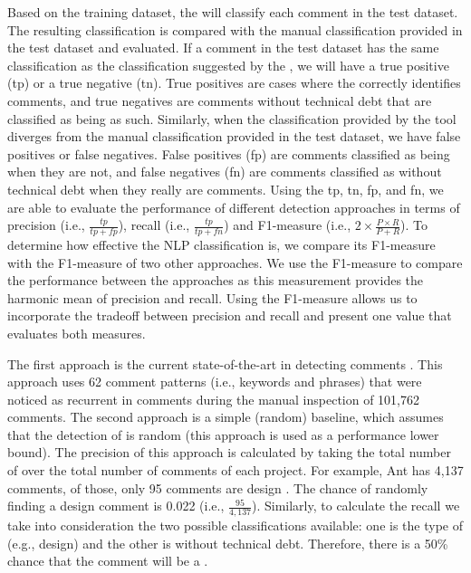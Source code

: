 Based on the training dataset, the  will classify each comment in the test dataset. The resulting classification is compared with the manual classification provided in the test dataset and evaluated. If a comment in the test dataset has the same classification as the classification suggested by the , we will have a true positive (tp) or a true negative (tn). True positives are cases where the  correctly identifies \SATD comments, and true negatives are comments without technical debt that are classified as being as such. Similarly, when the classification provided by the tool diverges from the manual classification provided in the test dataset, we have false positives or false negatives. False positives (fp) are comments classified as being \SATD when they are not, and false negatives (fn) are comments classified as without technical debt when they really are \SATD comments. Using the tp, tn, fp, and fn, we are able to evaluate the performance of different detection approaches in terms of precision (i.e., $\frac{tp}{tp + fp}$), recall (i.e., $\frac{tp}{tp + fn}$) and F1-measure (i.e., $2 \times \frac{P \times R}{P + R}$). To determine how effective the NLP classification is, we compare its F1-measure with the F1-measure of two other approaches. We use the F1-measure to compare the performance between the approaches as this measurement provides the harmonic mean of precision and recall. Using the F1-measure allows us to incorporate the tradeoff between precision and recall and present one value that evaluates both measures.

The first approach is the current state-of-the-art in detecting \SATD comments . This approach uses 62 comment patterns (i.e., keywords and phrases) that were noticed as recurrent in \SATD comments during the manual inspection of 101,762 comments. The second approach is a simple (random) baseline, which assumes that the detection of \SATD is random (this approach is used as a performance lower bound). The precision of this approach is calculated by taking the total number of \SATD over the total number of comments of each project. For example, Ant has 4,137 comments, of those, only 95 comments are design \SATD. The chance of randomly finding a design \SATD comment is 0.022 (i.e., $\frac{95}{4,137}$). Similarly, to calculate the recall we take into consideration the two possible classifications available: one is the type of \SATD (e.g., design) and the other is without technical debt. Therefore, there is a 50\% chance that the comment will be a \SATD. 

